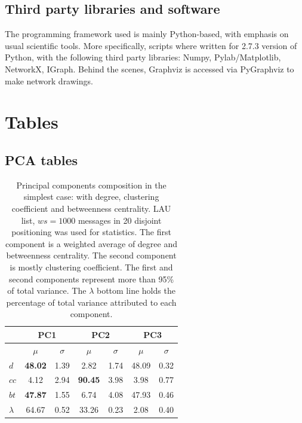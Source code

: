 \documentclass[%
 aip,
 jmp,%
 amsmath,amssymb,
 reprint,%
]{revtex4-1}
\begin{document}
\subsection{Third party libraries and software}
The programming framework used 
is mainly Python-based, with emphasis on usual
scientific tools. More specifically,
scripts where written for 2.7.3 version of Python,
with the following third party libraries: Numpy, Pylab/Matplotlib, NetworkX, IGraph.
Behind the scenes, Graphviz is accessed via PyGraphviz to make network drawings.
\section{Tables}\label{sectables}
\clearpage
\subsection{PCA tables}\label{sec:pcat}

\begin{table}[H]
  \centering
  \caption{Principal components composition in the simplest case: with degree, clustering coefficient and betweenness centrality. LAU list, $ws=1000$ messages in 20 disjoint positioning was used for statistics. The first component is a weighted average of degree and betweenness centrality. The second component is mostly clustering coefficient. The first and second components represent more than 95\% of total variance. The $\lambda$ bottom line holds the percentage of total variance attributed to each component.}
  \begin{tabular}{|l|c|c| c|c| c|c|}\hline
 & \multicolumn{2}{c|}{PC1}          & \multicolumn{2}{c|}{PC2} & \multicolumn{2}{c|}{PC3}  \\\hline
       & $\mu$            & $\sigma$ & $\mu$         & $\sigma$ & $\mu$ & $\sigma$  \\\hline
$d$       & {\bf 48.02}   & 1.39     & 2.82          & 1.74     & 48.09  & 0.32 \\
$cc$      & 4.12          & 2.94     & {\bf 90.45}   & 3.98     & 3.98  & 0.77 \\ 
$bt$      & {\bf 47.87}   & 1.55     & 6.74          & 4.08     & 47.93 & 0.46 \\ \hline
$\lambda$ & 64.67         & 0.52     & 33.26         & 0.23     & 2.08  & 0.40 \\ \hline
  \end{tabular}
  \label{compPCA0}
\end{table}
\end{document}
